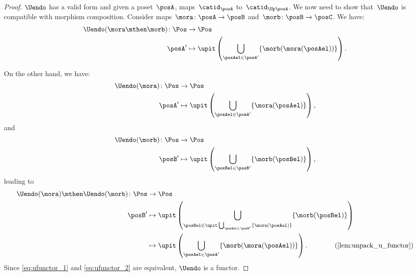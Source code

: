 \begin{proof}
  $\Uendo$ has a valid form and given a poset~$\posA$, maps~$\catid_\posA$ to~$\catid_{\Up \posA}$.
  We now need to show that~$\Uendo$ is compatible with morphism composition. Consider maps~$\mora\colon \posA \to \posB$ and~$\morb\colon \posB \to \posC$. We have:
  \begin{equation}
    \label{eq:ufunctor_1}
    \begin{aligned}
      \Uendo(\mora\mthen \morb)\colon \Pos &\to \Pos\\
      \posA'&\mapsto \upit \left( \bigcup_{\posAel\in \posA'} \{\morb(\mora(\posAel))\}\right).
    \end{aligned}
  \end{equation}

  On the other hand, we have:
  \begin{equation}
    \begin{aligned}
      \Uendo(\mora)\colon \Pos &\to \Pos\\
      \posA'&\mapsto \upit \left( \bigcup_{\posAel\in \posA'}\{\mora(\posAel)\}\right),
    \end{aligned}
  \end{equation}
  and
  \begin{equation}
    \begin{aligned}
      \Uendo(\morb)\colon \Pos &\to \Pos\\
      \posB'&\mapsto \upit \left( \bigcup_{\posBel\in \posB'}\{\morb(\posBel)\}\right),
    \end{aligned}
  \end{equation}
  leading to
  \begin{equation}
    \label{eq:ufunctor_2}
    \begin{aligned}
      \Uendo(\mora)\mthen \Uendo(\morb)\colon \Pos &\to \Pos\\
      \posB'&\mapsto \upit\left( \bigcup_{\posBel\in \upit \bigcup_{\posAel\in \posB'}\{\mora(\posAel)\}}\{\morb(\posBel)\}\right)\\
      &\mapsto \upit \left(\bigcup_{\posAel\in \posA'} \{ \morb(\mora(\posAel))\}\right). \qquad \qquad (\cref{lem:unpack_u_functor})
    \end{aligned}
  \end{equation}
  Since \cref{eq:ufunctor_1} and \cref{eq:ufunctor_2} are equivalent, $\Uendo$ is a functor.
\end{proof}
